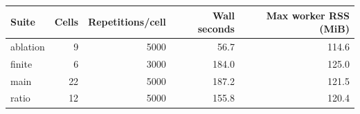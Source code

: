 \small
\begin{tabular}{lrrrr}
\toprule
Suite & Cells & Repetitions/cell & Wall seconds & Max worker RSS (MiB) \\
\midrule
ablation & 9 & 5000 & 56.7 & 114.6 \\
finite & 6 & 3000 & 184.0 & 125.0 \\
main & 22 & 5000 & 187.2 & 121.5 \\
ratio & 12 & 5000 & 155.8 & 120.4 \\
\bottomrule
\end{tabular}
